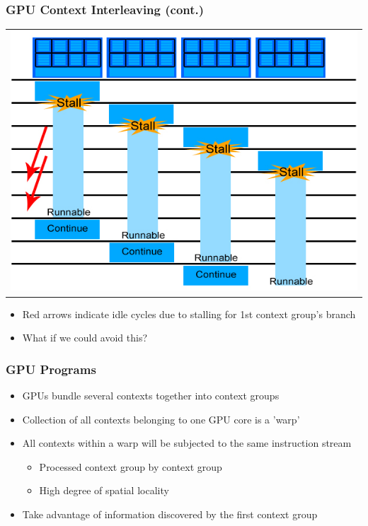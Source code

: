 \documentclass{beamer}
\begin{document}
\begin{frame}
	\frametitle{GPU Context Interleaving (cont.)}
	\begin{tabular}{c}
		\includegraphics[width=.75\textwidth]{GPU-context-interleaving-2.jpg}
	\end{tabular}
	\begin{itemize}
		\item<1-> Red arrows indicate idle cycles due to stalling for 1st context group's branch
		\item<2-> What if we could avoid this?
	\end{itemize}
\end{frame}

\begin{frame}
	\frametitle{GPU Programs}
	\begin{itemize}
		\item<1-> GPUs bundle several contexts together into context groups
		\item<2-> Collection of all contexts belonging to one GPU core is a 'warp'
		\item<3-> All contexts within a warp will be subjected to the same instruction stream
		\begin{itemize}
			\item<3-> Processed context group by context group
			\item<3-> High degree of spatial locality
		\end{itemize}
		\item<4-> Take advantage of information discovered by the first context group 
	\end{itemize}
\end{frame}
\end{document}
